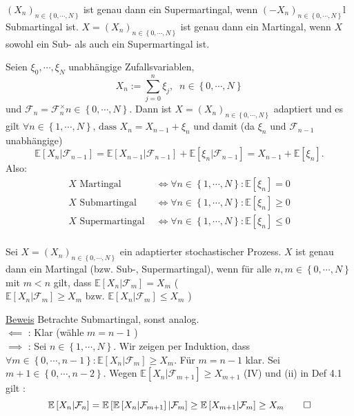 $ \left( X_n \right)_{n \in \left\{ 0 , \cdots, N \right\}} $ ist genau dann ein Supermartingal, wenn $ \left( - X_n \right)_{n \in \left\{ 0 , \cdots, N \right\} } $l Submartingal ist. $ X =  \left( X_n \right)_{n \in \left\{ 0 , \cdots, N \right\}}  $ ist genau dann ein Martingal, wenn $ X $ sowohl ein Sub- als auch ein Supermartingal ist.

Seien $ \xi_0 , \cdots, \xi_N $ unabhängige Zufallsvariablen,
$$ X_n := \sum_{j=0}^{n} \xi_j, \; \; n \in \left\{ 0 , \cdots, N \right\} $$
und $ \mathcal{F}_{n} = \mathcal{F}^{\times}_{n} n \in \left\{ 0 , \cdots, N \right\} $. Dann ist $   X =  \left( X_n \right)_{n \in \left\{ 0 , \cdots, N \right\}}  $  adaptiert und es gilt $ \forall n \in \left\{ 1 , \cdots, N \right\} \text{, dass  } X_n = X_{n-1} + \xi_n $ 
und damit (da $ \xi_n \text{ und }  \mathcal{F}_{n-1} $ unabhängige)
$$ \mathbb{E} \left[ X_n | \mathcal{F}_{n-1} \right] = \mathbb{E} \left[ X_{n-1} | \mathcal{F}_{n-1} \right] + \mathbb{E} \left[ \xi_n | \mathcal{F}_{n-1} \right] = X_{n-1} + \mathbb{E} \left[ \xi_n \right]. $$
Also:
\begin{align*}
	X \text{ Martingal }    &\iff  \forall n \in \left\{ 1 , \cdots, N \right\}: \mathbb{E} \left[ \xi_n \right] = 0 \\
	X \text{ Submartingal }    &\iff  \forall n \in \left\{ 1 , \cdots, N \right\}: \mathbb{E} \left[ \xi_n \right] \geq 0 \\
	X \text{ Supermartingal }    &\iff  \forall n \in \left\{ 1 , \cdots, N \right\}: \mathbb{E} \left[ \xi_n \right] \leq 0 \\
\end{align*}

Sei $    X =  \left( X_n \right)_{n \in \left\{ 0 , \cdots, N \right\}}  $ ein adaptierter stochastischer Prozess. $ X $ ist genau dann ein Martingal (bzw. Sub-, Supermartingal), wenn für alle $ n, m \in \left\{ 0 , \cdots,  N \right\} $ mit $ m < n $ gilt, dass $\mathbb{E} \left[ X_n | \mathcal{F}_{m} \right] = X_{m} $   (   $ \mathbb{E} \left[ X_n | \mathcal{F}_{m} \right] \geq X_{m} 
\text{ bzw. } \mathbb{E} \left[ X_n | \mathcal{F}_{m} \right] \leq X_{m}$ )

\underline{Beweis} Betrachte Submartingal, sonst analog. \\
$ \impliedby  $ : Klar (wähle $ m = n -1 $ )\\
$ \implies $ : Sei $ n \in \left\{ 1 , \cdots, N \right\} $. Wir zeigen per Induktion, dass $ \forall m \in \left\{ 0 , \cdots, n-1 \right\}: \mathbb{E} \left[ X_n | \mathcal{F}_{m} \right] \geq X_m $. Für $ m = n-1 $ klar. Sei $ m + 1 \in \left\{ 0 , \cdots, n-2 \right\}. $ 
Wegen $ \mathbb{E} \left[ X_n | \mathcal{F}_{m+1} \right] \geq X_{m+1} $ (IV) und (ii) in Def 4.1 gilt :
$$ \mathbb{E} \left[ X_n | \mathcal{F}_{n} \right] = \mathbb{E} \left[ \mathbb{E} \left[ X_n | \mathcal{F}_{m+1} \right] | \mathcal{F}_{m}\right] \geq \mathbb{E} \left[ X_{m+1}| \mathcal{F}_{m} \right] \geq X_m \qed $$

